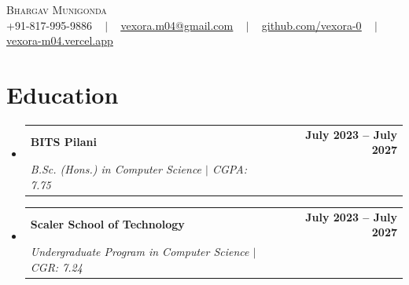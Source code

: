 \documentclass[letterpaper,11pt]{article}
\makeatletter
\newcommand{\resumeSubheading}[4]{
  \vspace{-2pt}\item
    \begin{tabular*}{1.0\textwidth}[t]{l@{\extracolsep{\fill}}r}
      \textbf{#1} & \textbf{\small #2} \\
      \textit{\small#3} & \textit{\small #4} \\
    \end{tabular*}\vspace{-7pt}
}
\newcommand{\resumeSubHeadingListStart}{\begin{itemize}[leftmargin=0.0in, label={}]}
\newcommand{\resumeSubHeadingListEnd}{\end{itemize}}
\makeatother
\begin{document}
\begin{center}
    {\Huge \scshape Bhargav Munigonda} \\ \vspace{1pt}
    \small +91-817-995-9886 ~ $|$ ~ \href{mailto:vexora.m04@gmail.com}{\underline{vexora.m04@gmail.com}} ~ $|$ ~
    \href{https://github.com/vexora-0}{\underline{github.com/vexora-0}} ~ $|$ ~
    \href{https://vexora-m04.vercel.app/}{\underline{vexora-m04.vercel.app}}
    \vspace{-8pt}
\end{center}

\section{Education}
  \resumeSubHeadingListStart
    \resumeSubheading
      {BITS Pilani}{July 2023 -- July 2027}
      {B.Sc. (Hons.) in Computer Science $|$ \textit{CGPA: 7.75}}{}
    \resumeSubheading
      {Scaler School of Technology}{July 2023 -- July 2027}
      {Undergraduate Program in Computer Science $|$ \textit{CGR: 7.24}}{}
  \resumeSubHeadingListEnd
\end{document}
